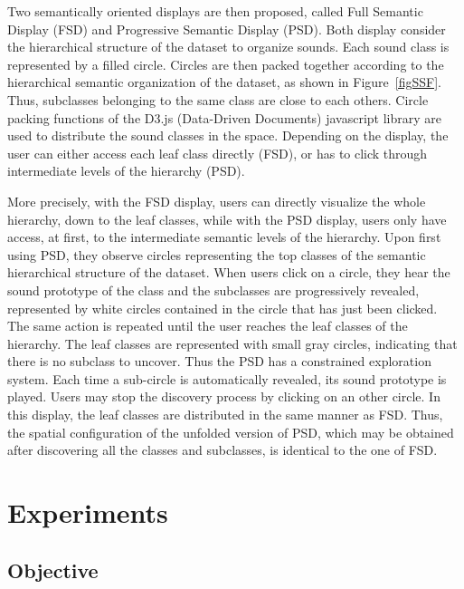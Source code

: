 \documentclass{aes2e}
\newcommand{\mr}[1]{\textcolor{green}{Mathias : #1}}
\begin{document}
Two semantically oriented displays are then proposed, called Full Semantic Display (FSD) and Progressive Semantic Display (PSD). Both display  consider the hierarchical structure of the dataset to organize sounds. Each sound class is represented by a filled circle. Circles are then packed together according to the hierarchical semantic organization of the dataset, as shown in Figure~\ref{figSSF}. Thus, subclasses belonging to the same class are close to each others. Circle packing functions of the D3.js (Data-Driven Documents) javascript library \cite{2011-d3} are used to distribute the sound classes in the space. Depending on the display, the user can either access each leaf class directly (FSD), or has to click through intermediate levels of the hierarchy (PSD). 

More precisely, with the FSD display, users can directly visualize the whole hierarchy, down to the leaf classes, while with the PSD display, users only have access, at first, to the intermediate semantic levels of the hierarchy. Upon first using PSD, they observe circles representing the top classes of the semantic hierarchical structure of the dataset. When users click on a circle, they hear the sound prototype of the class and the subclasses are progressively revealed, represented by white circles contained in the circle that has just been clicked. The same action is repeated until the user reaches the leaf classes of the hierarchy. The leaf classes are represented with small gray circles, indicating that there is no subclass to uncover. Thus the PSD has a constrained exploration system. Each time a sub-circle is automatically revealed, its sound prototype is played. Users may stop the discovery process by clicking on an other circle. In this display, the leaf classes are distributed  in the same manner as FSD. Thus, the spatial configuration of the unfolded version of PSD, which may be obtained after discovering all the classes and subclasses, is identical to the one of FSD.


\section{Experiments} \label{test}

\subsection{Objective}
\end{document}
